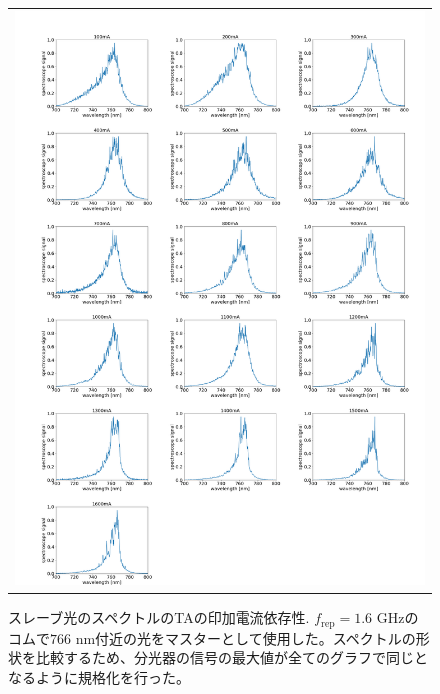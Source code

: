 \documentclass[uplatex, dvipdfmx, a4paper, report, papersize, 11pt]{jsbook}
\begin{document}
\newpage
\begin{figure}[H]
  \centering
    \begin{tabular}{c}
      \begin{minipage}{1\hsize}
        \centering
          \includegraphics[keepaspectratio,  scale=0.20,  angle=0]
                          {figures/chapter4/760_slave-current_spectrum_astro.png}
                          \caption{スレーブ光のスペクトルのTAの印加電流依存性. $f_\mathrm{rep} = 1.6$ GHzのコムで$766$ nm付近の光をマスターとして使用した。スペクトルの形状を比較するため、分光器の信号の最大値が全てのグラフで同じとなるように規格化を行った。}
                          \label{760_slave-current_spectrum_astro}
      \end{minipage}
  \end{tabular}
\end{figure}
\end{document}
